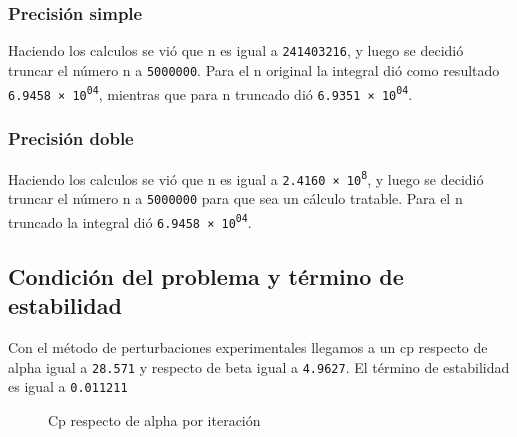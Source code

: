 \documentclass[11pt,a4paper]{article}
\begin{document}
\subsubsection{Precisión simple}

Haciendo los calculos se vió que n es igual a \texttt{241403216}, y luego se decidió truncar el número n a \texttt{5000000}. Para el n original la integral dió como resultado \texttt{\num{6.9458e+04}}, mientras que para n truncado dió \texttt{\num{6.9351e+04}}.

\subsubsection{Precisión doble}

Haciendo los calculos se vió que n es igual a \texttt{\num{2.4160e8}}, y luego se decidió truncar el número n a \texttt{5000000} para que sea un cálculo tratable. Para el n truncado la integral dió \texttt{\num{6.9458e+04}}.

\subsection{Condición del problema y término de estabilidad}
Con el método de perturbaciones experimentales llegamos a un cp respecto de alpha igual a \texttt{28.571} y respecto de beta igual a \texttt{4.9627}. El término de estabilidad es igual a \texttt{0.011211}

\begin{figure}[H]
	\caption{Cp respecto de alpha por iteración}
	\label{fig:cpsa}
\end{figure}
\end{document}
